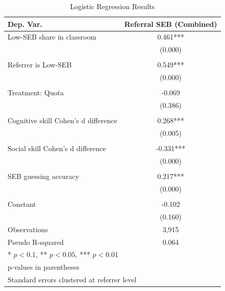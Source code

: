 \documentclass[11pt,a4paper,oneside]{article}
\begin{document}
\begin{table}
\centering
\caption{Logistic Regression Results}
\begin{tabular}{@{}lc@{}}
\toprule
Dep. Var. & Referral SEB (Combined) \\
\midrule
Low-SEB share in classroom & 0.461*** \\
 & (0.000) \\
 \\
Referrer is Low-SEB & 0.549*** \\
 & (0.000) \\
 \\
Treatment: Quota & -0.069 \\
 & (0.386) \\
 \\
Cognitive skill Cohen's d difference & 0.268*** \\
 & (0.005) \\
 \\
Social skill Cohen's d difference & -0.331*** \\
 & (0.000) \\
 \\
SEB guessing accuracy & 0.217*** \\
 & (0.000) \\
 \\
Constant & -0.102 \\
 & (0.160) \\
\midrule
Observations & 3,915 \\
Pseudo R-squared & 0.064 \\
\midrule
\multicolumn{2}{l}{* $p<0.1$, ** $p<0.05$, *** $p<0.01$} \\
\multicolumn{2}{l}{p-values in parentheses} \\
\multicolumn{2}{l}{Standard errors clustered at referrer level} \\
\end{tabular}
\label{tab:regression-results-combined}
\end{table}
\end{document}
